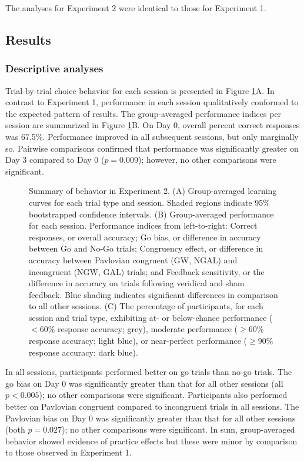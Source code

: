 \documentclass[a4paper,12pt]{article}
\begin{document}
\begin{refsection}[main]
The analyses for Experiment 2 were identical to those for Experiment 1. 

\subsection*{Results}

\subsubsection*{Descriptive analyses}

Trial-by-trial choice behavior for each session is presented in Figure \ref{fig:exp02_behavior}A. In contrast to Experiment 1, performance in each session qualitatively conformed to the expected pattern of results. The group-averaged performance indices per session are summarized in Figure \ref{fig:exp02_behavior}B. On Day 0, overall percent correct responses was 67.5\%. Performance improved in all subsequent sessions, but only marginally so. Pairwise comparisons confirmed that performance was significantly greater on Day 3 compared to Day 0 ($p = 0.009$); however, no other comparisons were significant.

\begin{figure}[hpt]
    \centerline{}
    \caption{Summary of behavior in Experiment 2. (A) Group-averaged learning curves for each trial type and session. Shaded regions indicate 95\% bootstrapped confidence intervals. (B) Group-averaged performance for each session. Performance indices from left-to-right: Correct responses, or overall accuracy; Go bias, or difference in accuracy between Go and No-Go trials; Congruency effect, or difference in accuracy between Pavlovian congruent (GW, NGAL) and incongruent (NGW, GAL) trials; and Feedback sensitivity, or the difference in accuracy on trials following veridical and sham feedback. Blue shading indicates significant differences in comparison to all other sessions. (C) The percentage of participants, for each session and trial type, exhibiting at- or below-chance performance ($< 60\%$ response accuracy; grey), moderate performance ($\geq 60\%$ response accuracy; light blue), or near-perfect performance ($\geq 90\%$ response accuracy; dark blue).}
    \label{fig:exp02_behavior}
\end{figure}

In all sessions, participants performed better on go trials than no-go trials. The go bias on Day 0 was significantly greater than that for all other sessions (all $p < 0.005$); no other comparisons were significant. Participants also performed better on Pavlovian congruent compared to incongruent trials in all sessions. The Pavlovian bias on Day 0 was significantly greater than that for all other sessions (both $p = 0.027$); no other comparisons were significant. In sum, group-averaged behavior showed evidence of practice effects but these were minor by comparison to those observed in Experiment 1. 


\end{refsection}
\end{document}
